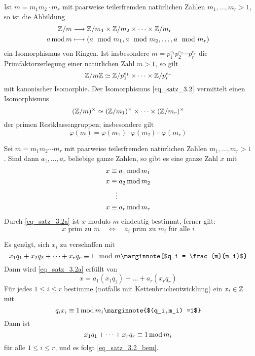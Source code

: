 \begin{satz} \label{satz_3.2}
	Ist $m = m_1 m_2 \cdot m_r$ mit paarweise teilerfremden natürlichen Zahlen $m_1,\dots,m_r > 1$, so ist die Abbildung 
	\begin{equation}
	\begin{aligned}
		\mathbb{Z}/m &\longrightarrow \mathbb{Z}/m_1 \times \mathbb{Z}/m_2 \times \cdots \times \mathbb{Z}/m_r \\
		a \operatorname{mod} m &\longmapsto (a \mod m_1, a \mod m_2, \dots, a \mod m_r)	\label{eq_satz_3.2}
	\end{aligned}
	\end{equation}
	ein Isomorphismus von Ringen. Ist insbesondere $m = p_1^{e_1} p_2^{e_2} \cdots p_r^{e_r}$ die Primfaktorzerlegung einer natürlichen Zahl $m > 1$, so gilt
	\[ \mathbb{Z}/m\mathbb{Z} \simeq \mathbb{Z}/p_1^{e_1} \times \cdots \times \mathbb{Z}/p_r^{e_r} \]
	mit kanonischer Isomorphie. Der Isomorphismus $\eqref{eq_satz_3.2}$ vermittelt einen Isomorphismus
	\[ (\mathbb{Z}/m)^\times \simeq (\mathbb{Z}/m_1)^\times \times \dots \times (\mathbb{Z}/m_r)^\times \]
	der primen Restklassengruppen; insbesondere gilt
	\[ \varphi(m) = \varphi(m_1) \cdot \varphi(m_2) \cdots \varphi(m_r) \]
\end{satz}

\setcounter{countsatz}{1}
\begin{satz} \label{satz_3.2a}
	Sei $m = m_1m_2 \cdots m_r$ mit paarweise teilerfremden natürlichen Zahlen $m_1,\dots,m_r > 1$. Sind dann $a_1,\dots,a_r$ beliebige ganze Zahlen, so gibt es eine ganze Zahl $x$ mit  
	\begin{equation}
	\begin{aligned}
		x &\equiv a_1 \operatorname{mod} m_1 \\
		x &\equiv a_2 \operatorname{mod} m_2 \\
		&\ \ \vdots \\
		x &\equiv a_r \operatorname{mod} m_r \label{eq_satz_3.2a}
	\end{aligned}
	\end{equation}
	Durch \eqref{eq_satz_3.2a} ist $x$ modulo $m$ eindeutig bestimmt, ferner gilt:
	\[ x \text{ prim zu } m \quad \Leftrightarrow \quad a_i \text{ prim zu } m_i \text{ für alle } i \]
\end{satz}

	Es genügt, sich $x_i$ zu verschaffen mit
	\begin{equation}
		x_1q_1 + x_2q_2 + \dots + x_rq_r \kon 1 \mod m \marginnote{$q_i = \frac{m}{m_i}$} \label{eq_satz_3.2_bem}
	\end{equation}
	Dann wird \eqref{eq_satz_3.2a} erfüllt von
	\[x = a_1(x_1q_1) + \dots + a_r(x_rq_r) \]
	Für jedes $1 \leq i \leq r$ bestimme (notfalls mit Kettenbruchentwicklung) ein $x_i \in \mathbb{Z}$ mit
	\[ q_i x_i \kon 1 \modu m_i \marginnote{$(q_i,m_i) =1$} \]
	Dann ist 
	\[ x_1q_1 + \dots + x_rq_r \equiv 1 \operatorname{mod} m_i\]
	für alle $1 \leq i \leq r$, und es folgt \eqref{eq_satz_3.2_bem}.
\newpage
